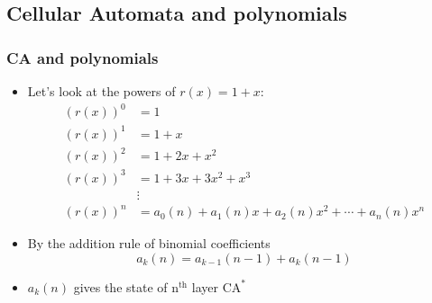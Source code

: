 \documentclass{beamer}
\begin{document}
\subsection{Cellular Automata and polynomials}
\begin{frame}
    \frametitle{CA and polynomials}
    \begin{itemize}
        \item Let's look at the powers of $r(x) = 1 + x$:
        \begin{align*}
            (r(x))^{0} &=1 \\
            (r(x))^{1} &=1+x \\
            (r(x))^{2} &=1+2 x+x^{2} \\
            (r(x))^{3} &=1+3 x+3 x^{2}+x^{3} \\ & \vdots \\
            (r(x))^{n} &=a_{0}(n)+a_{1}(n) x+a_{2}(n) x^{2}+\cdots+a_{n}(n) x^{n} 
        \end{align*}
        \item By the addition rule of binomial coefficients
        \begin{equation*}
            a_k(n) = a_{k-1}(n-1) + a_k(n-1)
        \end{equation*}
        \item $a_k(n)$ gives the state of $\text{n}^{\text{th}}$ layer $\text{CA}^*$ 
    \end{itemize}
\end{frame}
\end{document}
